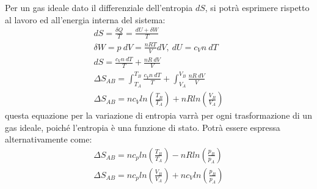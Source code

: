 \documentclass{article}
\numberwithin{equation}{subsection}
\begin{document}
Per un gas ideale dato il differenziale dell'entropia $dS$, si potrà esprimere rispetto al lavoro ed all'energia interna del sistema:
\begin{gather}
    dS=\displaystyle\frac{\delta Q}{T}=\frac{dU+\delta W}{T}\\
    \delta  W=p\:dV=\displaystyle\frac{nRT}{V}dV,\:dU=c_Vn\:dT\\
    dS=\displaystyle\frac{c_Vn\:dT}{T}+\frac{nR\:dV}{V}\\
    \Delta S_{AB}=\int_{T_A}^{T_B}\displaystyle\frac{c_Vn\:dT}{T}+\int_{V_A}^{V_B}\frac{nR\:dV}{V}\\
    \Delta S_{AB}=nc_Vln\left(\displaystyle\frac{T_B}{T_A}\right)+nRln\left(\frac{V_B}{V_A}\right)
\end{gather} 
questa equazione per la variazione di entropia varrà per ogni trasformazione di un gas ideale, poiché l'entropia è una funzione di stato. Potrà essere espressa 
alternativamente come:
\begin{gather}
    \Delta S_{AB}=nc_pln\left(\displaystyle\frac{T_B}{T_A}\right)-nRln\left(\displaystyle\frac{p_B}{p_A}\right)\\
    \Delta S_{AB}=nc_pln\left(\displaystyle\frac{V_B}{V_A}\right)+nc_Vln\left(\frac{p_B}{p_A}\right)
\end{gather}
\end{document}
